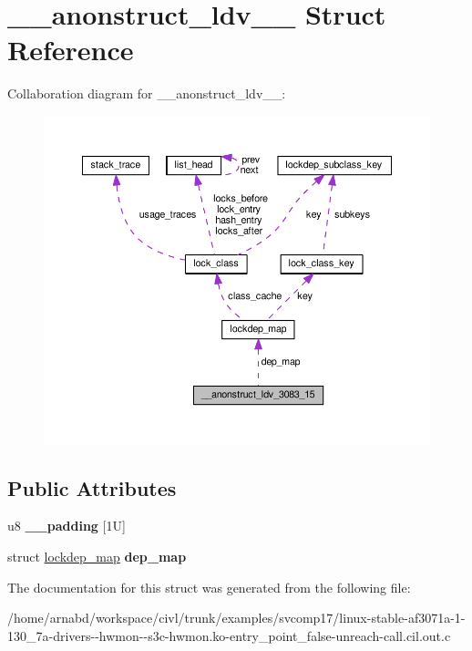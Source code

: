 \hypertarget{struct____anonstruct__ldv__3083__15}{}\section{\+\_\+\+\_\+anonstruct\+\_\+ldv\+\_\+\_ Struct Reference}
\label{struct____anonstruct__ldv__3083__15}


Collaboration diagram for \+\_\+\+\_\+anonstruct\+\_\+ldv\+\_\+\_\+:
\nopagebreak
\begin{figure}[H]
\begin{center}
\leavevmode
\includegraphics[width=350pt]{struct____anonstruct__ldv__3083__15__coll__graph}
\end{center}
\end{figure}
\subsection*{Public Attributes}
\begin{DoxyCompactItemize}
\item 
\hypertarget{struct____anonstruct__ldv__3083__15_a4ad334861557c1cd8fd238eb4c83b183}{}u8 {\bfseries \+\_\+\+\_\+padding} \mbox{[}1\+U\mbox{]}\label{struct____anonstruct__ldv__3083__15_a4ad334861557c1cd8fd238eb4c83b183}

\item 
\hypertarget{struct____anonstruct__ldv__3083__15_ac298f9564354180e4bd1262f546d8152}{}struct \hyperlink{structlockdep__map}{lockdep\+\_\+map} {\bfseries dep\+\_\+map}\label{struct____anonstruct__ldv__3083__15_ac298f9564354180e4bd1262f546d8152}

\end{DoxyCompactItemize}


The documentation for this struct was generated from the following file\+:\begin{DoxyCompactItemize}
\item 
/home/arnabd/workspace/civl/trunk/examples/svcomp17/linux-\/stable-\/af3071a-\/1-\/130\+\_\+7a-\/drivers-\/-\/hwmon-\/-\/s3c-\/hwmon.\+ko-\/entry\+\_\+point\+\_\+false-\/unreach-\/call.\+cil.\+out.\+c\end{DoxyCompactItemize}
